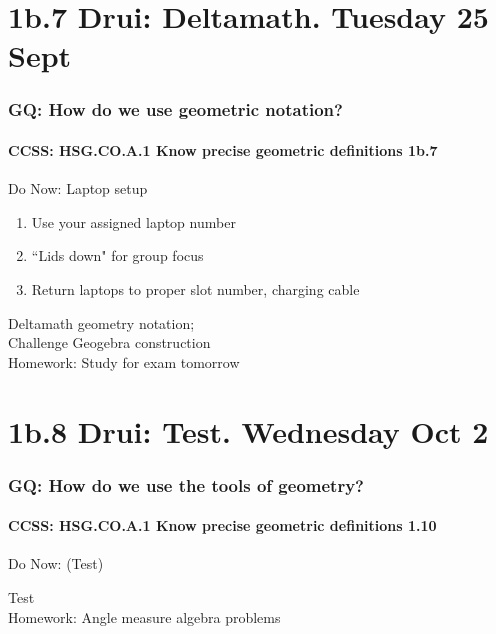 \documentclass{beamer}
\begin{document}
\section{1b.7 Drui: Deltamath. Tuesday 25 Sept}
  \frame
  {
    \frametitle{GQ: How do we use geometric notation?}
    \framesubtitle{CCSS: HSG.CO.A.1 Know precise geometric definitions  \alert{1b.7}}

    \begin{block}{Do Now: Laptop setup}
    \begin{enumerate}
        \item Use your assigned laptop number
        \item ``Lids down" for group focus
        \item Return laptops to proper slot number, charging cable
    \end{enumerate}
    \end{block}
    Deltamath geometry notation; \\Challenge Geogebra construction\\
    \vspace{1cm}
    Homework: Study for \alert{exam tomorrow}
  }

\section{1b.8 Drui: Test. Wednesday Oct 2}
        \frame
        {
          \frametitle{GQ: How do we use the tools of geometry?}
          \framesubtitle{CCSS: HSG.CO.A.1 Know precise geometric definitions  \alert{1.10}}

          \begin{block}{Do Now: (Test)}
          \end{block}
          Test\\
          \vspace{1cm}
          Homework: Angle measure algebra problems
        }
\end{document}
